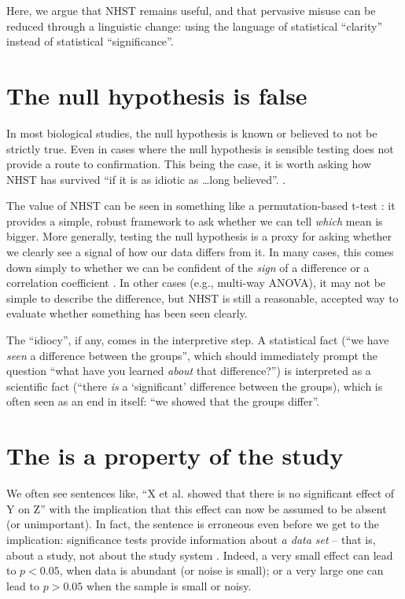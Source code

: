 Here, we argue that NHST remains useful, and that pervasive misuse can be reduced through a linguistic change: using the language of statistical ``clarity'' instead of statistical ``significance''.

\section*{The null hypothesis is false}

In most biological studies, the null hypothesis is known or believed to not be strictly true.
Even in cases where the null hypothesis is sensible \citep[e.g., particle physics][]{Staley2017} \pval testing does not provide a route to confirmation.
This being the case, it is worth asking how NHST has survived ``if it is as idiotic as \ldots long believed''. 
 \citet{Kramer2011}.

The value of NHST can be seen in something like a permutation-based t-test \cite[Chapter 1]{GoodBook}: it provides a simple, robust framework to ask whether we can tell \emph{which} mean is bigger. 
More generally, testing the null hypothesis is a proxy for asking whether we clearly see a signal of how our data differs from it.
In many cases, this comes down simply to whether we can be confident of the \emph{sign} of a difference or a correlation coefficient \citep{robinson2001past}. 
In other cases (e.g., multi-way ANOVA), it may not be simple to describe the difference, but NHST is still a reasonable, accepted way to evaluate whether something has been seen clearly.

The ``idiocy'', if any, comes in the interpretive step. A statistical fact (``we have \emph{seen} a difference between the groups'', which should immediately prompt the question ``what have you learned \emph{about} that difference?'') is interpreted as a scientific fact (``there \emph{is} a `significant' difference between the groups), which is often seen as an end in itself: ``we showed that the groups differ''.

\section*{The \pval is a property of the study}

We often see sentences like, ``X et al. showed that there is no significant effect of Y on Z'' with the implication that this effect can now be assumed to be absent (or unimportant). In fact, the sentence is erroneous even before we get to the implication: significance tests provide information about \emph{a data set} -- that is, about a study, not about the study system \citep{HoenigandHeisey2001}.
Indeed, a very small effect can lead to $p < 0.05$, when data is abundant (or noise is small); or a very large one can lead to $p > 0.05$ when the sample is small or noisy. 

